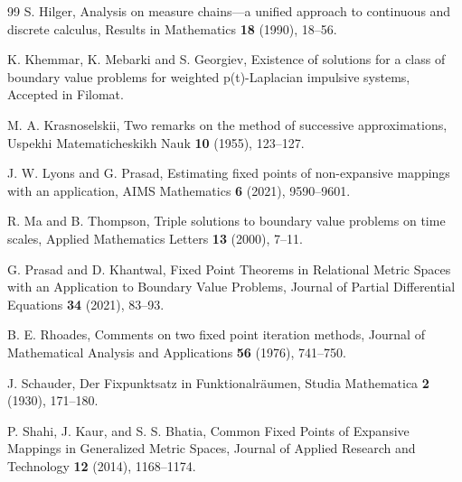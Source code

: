 \documentclass[reqno, 12pt]{amsart}
\numberwithin{equation}{section}
\begin{document}
\begin{thebibliography}{99}
 S. Hilger, Analysis on measure chains---a unified approach to continuous and discrete calculus, Results in Mathematics \textbf{18} (1990), 18--56.


 K. Khemmar, K. Mebarki and S. Georgiev, Existence of solutions for a class of boundary value problems for weighted p(t)-Laplacian impulsive systems, Accepted in Filomat.

 M. A. Krasnoselskii, Two remarks on the method of successive approximations, Uspekhi Matematicheskikh Nauk \textbf{10} (1955), 123--127.

 J. W. Lyons and G. Prasad, Estimating fixed points of non-expansive mappings with an application, AIMS Mathematics \textbf{6} (2021), 9590--9601.

 R. Ma and B. Thompson, Triple solutions to boundary value problems on time scales, Applied Mathematics Letters \textbf{13} (2000), 7--11.




 G. Prasad and D. Khantwal, Fixed Point Theorems in Relational Metric Spaces with an Application to Boundary Value Problems, Journal of Partial Differential Equations \textbf{34} (2021), 83--93.

 B. E. Rhoades, Comments on two fixed point iteration methods, Journal of Mathematical Analysis and Applications \textbf{56} (1976), 741--750.

 J. Schauder, Der Fixpunktsatz in Funktionalräumen, Studia Mathematica \textbf{2} (1930), 171--180.

 P. Shahi, J. Kaur, and S. S. Bhatia, Common Fixed Points of Expansive Mappings in Generalized Metric Spaces, Journal of Applied Research and Technology \textbf{12} (2014), 1168--1174.


\end{thebibliography}
\end{document}

